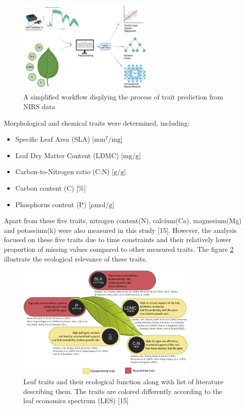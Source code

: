 \documentclass[12pt,a4paper]{report}
\begin{document}
\begin{figure}[h]
    \centering
    \includegraphics[width=0.6\textwidth]{Figures/nirs.png}
    \caption{A simplified workflow displying the process of trait prediction from NIRS data}
    \label{fig:nirs_workflow}
\end{figure}
Morphological and chemical traits were determined, including:
\begin{itemize}
    \item Specific Leaf Area (SLA)  [$\text{mm}^2/\text{mg}$]
    \item Leaf Dry Matter Content (LDMC)  [$\text{mg}/\text{g}$]
    \item Carbon-to-Nitrogen ratio (C:N)  [$\text{g}/\text{g}$]
    \item Carbon content (C)  [\%]
    \item Phosphorus content (P) [$\mu\text{mol}/\text{g}$]
\end{itemize}

Apart from these five traits, nitrogen content(N), calcium(Ca), magnesium(Mg) and potassium(k) were also measured in this study [15]. However, the analysis focused on these five traits due to time constraints and their relatively lower proportion of missing values compared to other measured traits. The figure \ref{fig:traits} illustrate the ecological relevance of these traits.

\begin{figure}[h]
    \centering
    \includegraphics[width=0.8\textwidth]{Figures/traits.jpg}
    \caption{Leaf traits and their ecological function along with list of literature describing them. The traits are colored differently according to the leaf economics spectrum (LES) [15]}
    \label{fig:traits}
\end{figure}
\end{document}
